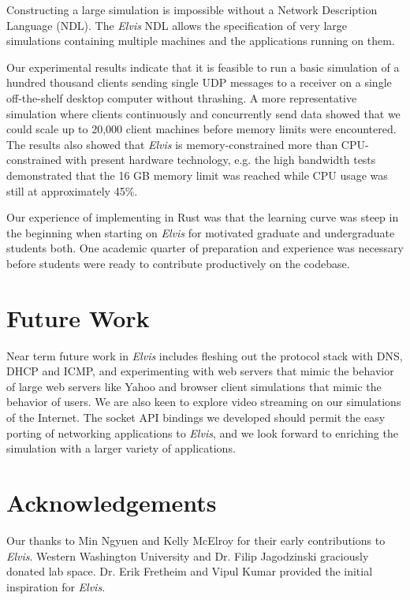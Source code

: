 \documentclass[journal]{IEEEtran} %
\newcommand{\elvis}{\textit{Elvis}}
\begin{document}
Constructing a large simulation is impossible without a Network Description Language (NDL). The \elvis{} NDL allows the specification of very large simulations containing multiple machines and the applications running on them.

Our experimental results indicate that it is feasible to run a basic simulation of a hundred thousand clients sending single UDP messages to a receiver on a single off-the-shelf desktop computer without thrashing. A more representative simulation where clients continuously and concurrently send data showed that we could scale up to 20,000 client machines before memory limits were encountered. The results also showed that \elvis{} is memory-constrained more than CPU-constrained with present hardware technology, e.g. the high bandwidth tests demonstrated that the 16 GB memory limit was reached while CPU usage was still at approximately 45\%.

Our experience of implementing in Rust was that the learning curve was steep in the beginning when starting on \elvis{} for motivated graduate and undergraduate students both. One academic quarter of preparation and experience was necessary before students were ready to contribute productively on the codebase.
\section{Future Work}

Near term future work in \elvis{} includes fleshing out the protocol stack with DNS, DHCP and ICMP, and experimenting with web servers that mimic the behavior of large web servers like Yahoo and browser client simulations that mimic the behavior of users. We are also keen to explore video streaming on our simulations of the  Internet. The socket API bindings we developed should permit the easy porting of networking applications to \elvis{}, and we look forward to enriching the simulation with a larger variety of applications.

\section{Acknowledgements}

Our thanks to Min Ngyuen and Kelly McElroy for their early contributions to \elvis{}. Western Washington University and Dr. Filip Jagodzinski graciously donated lab space.
Dr. Erik Fretheim and Vipul Kumar provided the initial inspiration for \elvis{}.
\end{document}
